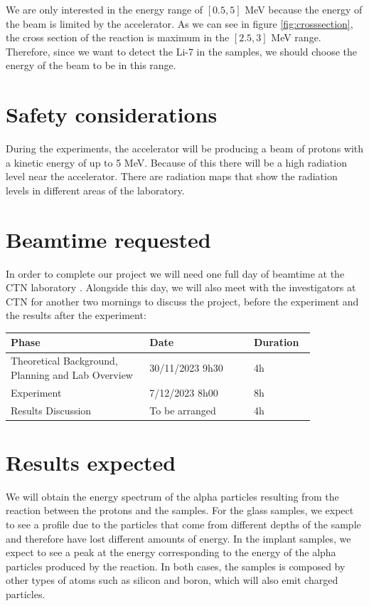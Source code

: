\documentclass{article}
\begin{document}
\begin{multicols}{2}
We are only interested in the energy range of $[0.5,5]$ MeV because the energy of the beam is limited by the accelerator.
As we can see in figure \ref{fig:crosssection}, the cross section of the reaction is maximum in the $[2.5,3]$ MeV range. 
Therefore, since we want to detect the Li-7 in the samples, we should choose the energy of the beam to be in this range.

\section{Safety considerations}

During the experiments, the accelerator will be producing a beam of protons with a kinetic energy of up to 5 MeV. Because of this there will be a high radiation level near the accelerator.
There are radiation maps that show the radiation levels in different areas of the laboratory.

\section{Beamtime requested}

In order to complete our project we will need one full day of beamtime at the CTN laboratory \cite{IST}. Alongside this day, we will
also meet with the investigators at CTN for another two mornings to discuss the project, before the experiment and the
results after the experiment:

\begin{table}[H]
\centering
\begin{tabular}{|w{0.4\linewidth}|w{0.3\linewidth}|w{0.15\linewidth}|}
\hline
Phase & Date & Duration \\ \hline
Theoretical Background, Planning and Lab Overview & 30/11/2023 9h30 & 4h \\ \hline
Experiment & 7/12/2023 8h00 & 8h \\ \hline
Results Discussion & To be arranged & 4h \\ \hline
\end{tabular}
\end{table}

\section{Results expected}

We will obtain the energy spectrum of the alpha particles resulting from the reaction between the protons and the
samples. 
For the glass samples, we expect to see a profile due to the particles that come from different depths of the sample and
therefore have lost different amounts of energy. In the implant samples, we expect to see a peak at the energy corresponding
to the energy of the alpha particles produced by the reaction.
In both cases, the samples is composed by other types of atoms such as silicon and boron, which will also emit charged
particles.


\end{multicols}
\end{document}
